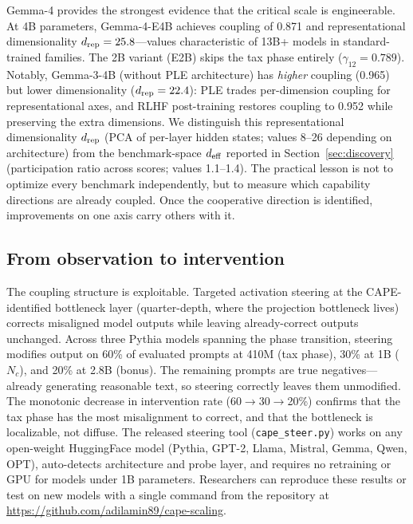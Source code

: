 \documentclass{article}
\begin{document}
Gemma-4 provides the strongest evidence that the critical scale is engineerable.
At 4B parameters, Gemma-4-E4B achieves coupling of 0.871 and
representational dimensionality $d_{\rm rep} = 25.8$---values characteristic of
13B+ models in standard-trained families.
The 2B variant (E2B) skips the tax phase entirely ($\gamma_{12} = 0.789$).
Notably, Gemma-3-4B (without PLE architecture) has \emph{higher} coupling (0.965)
but lower dimensionality ($d_{\rm rep} = 22.4$):
PLE trades per-dimension coupling for representational axes,
and RLHF post-training restores coupling to 0.952 while preserving the extra dimensions.
We distinguish this representational dimensionality $d_{\rm rep}$
(PCA of per-layer hidden states; values 8--26 depending on architecture)
from the benchmark-space $d_{\rm eff}$ reported in Section~\ref{sec:discovery}
(participation ratio across scores; values 1.1--1.4).
The practical lesson is not to optimize every benchmark independently,
but to measure which capability directions are already coupled.
Once the cooperative direction is identified,
improvements on one axis carry others with it.

\subsection{From observation to intervention}

The coupling structure is exploitable.
Targeted activation steering at the CAPE-identified bottleneck layer
(quarter-depth, where the projection bottleneck lives)
corrects misaligned model outputs while leaving already-correct outputs unchanged.
Across three Pythia models spanning the phase transition,
steering modifies output on 60\% of evaluated prompts at 410M (tax phase),
30\% at 1B ($N_c$), and 20\% at 2.8B (bonus).
The remaining prompts are true negatives---already generating reasonable text,
so steering correctly leaves them unmodified.
The monotonic decrease in intervention rate (60$\to$30$\to$20\%)
confirms that the tax phase has the most misalignment to correct,
and that the bottleneck is localizable, not diffuse.
The released steering tool (\texttt{cape\_steer.py})
works on any open-weight HuggingFace model (Pythia, GPT-2, Llama, Mistral, Gemma, Qwen, OPT),
auto-detects architecture and probe layer,
and requires no retraining or GPU for models under 1B parameters.
Researchers can reproduce these results or test on new models
with a single command from the repository
at \url{https://github.com/adilamin89/cape-scaling}.
\end{document}
